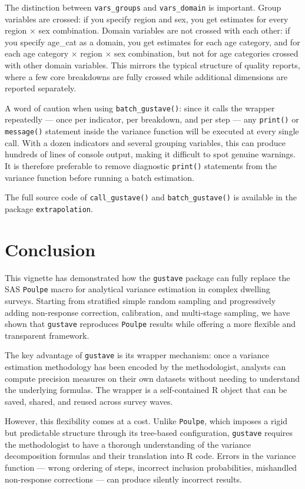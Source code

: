 \documentclass[
]{article}
\begin{document}
The distinction between \texttt{vars\_groups} and \texttt{vars\_domain}
is important. Group variables are crossed: if you specify region and
sex, you get estimates for every region × sex combination. Domain
variables are not crossed with each other: if you specify age\_cat as a
domain, you get estimates for each age category, and for each age
category × region × sex combination, but not for age categories crossed
with other domain variables. This mirrors the typical structure of
quality reports, where a few core breakdowns are fully crossed while
additional dimensions are reported separately.

A word of caution when using \texttt{batch\_gustave()}: since it calls
the wrapper repeatedly --- once per indicator, per breakdown, and per
step --- any \texttt{print()} or \texttt{message()} statement inside the
variance function will be executed at every single call. With a dozen
indicators and several grouping variables, this can produce hundreds of
lines of console output, making it difficult to spot genuine warnings.
It is therefore preferable to remove diagnostic \texttt{print()}
statements from the variance function before running a batch estimation.

The full source code of \texttt{call\_gustave()} and
\texttt{batch\_gustave()} is available in the package
\texttt{extrapolation}.

\section{Conclusion}\label{conclusion}

This vignette has demonstrated how the \texttt{gustave} package can
fully replace the SAS \texttt{Poulpe} macro for analytical variance
estimation in complex dwelling surveys. Starting from stratified simple
random sampling and progressively adding non-response correction,
calibration, and multi-stage sampling, we have shown that
\texttt{gustave} reproduces \texttt{Poulpe} results while offering a
more flexible and transparent framework.

The key advantage of \texttt{gustave} is its wrapper mechanism: once a
variance estimation methodology has been encoded by the methodologist,
analysts can compute precision measures on their own datasets without
needing to understand the underlying formulas. The wrapper is a
self-contained R object that can be saved, shared, and reused across
survey waves.

However, this flexibility comes at a cost. Unlike \texttt{Poulpe}, which
imposes a rigid but predictable structure through its tree-based
configuration, \texttt{gustave} requires the methodologist to have a
thorough understanding of the variance decomposition formulas and their
translation into R code. Errors in the variance function --- wrong
ordering of steps, incorrect inclusion probabilities, mishandled
non-response corrections --- can produce silently incorrect results.
\end{document}
